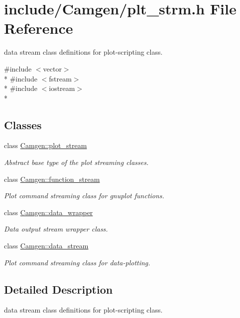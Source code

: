 \hypertarget{a00700}{\section{include/\-Camgen/plt\-\_\-strm.h File Reference}
\label{a00700}
}


data stream class definitions for plot-\/scripting class.  


{\ttfamily \#include $<$vector$>$}\\*
{\ttfamily \#include $<$fstream$>$}\\*
{\ttfamily \#include $<$iostream$>$}\\*
\subsection*{Classes}
\begin{DoxyCompactItemize}
\item 
class \hyperlink{a00427}{Camgen\-::plot\-\_\-stream}
\begin{DoxyCompactList}\small\item\em Abstract base type of the plot streaming classes. \end{DoxyCompactList}\item 
class \hyperlink{a00231}{Camgen\-::function\-\_\-stream}
\begin{DoxyCompactList}\small\item\em Plot command streaming class for gnuplot functions. \end{DoxyCompactList}\item 
class \hyperlink{a00118}{Camgen\-::data\-\_\-wrapper}
\begin{DoxyCompactList}\small\item\em Data output stream wrapper class. \end{DoxyCompactList}\item 
class \hyperlink{a00117}{Camgen\-::data\-\_\-stream}
\begin{DoxyCompactList}\small\item\em Plot command streaming class for data-\/plotting. \end{DoxyCompactList}\end{DoxyCompactItemize}


\subsection{Detailed Description}
data stream class definitions for plot-\/scripting class. 